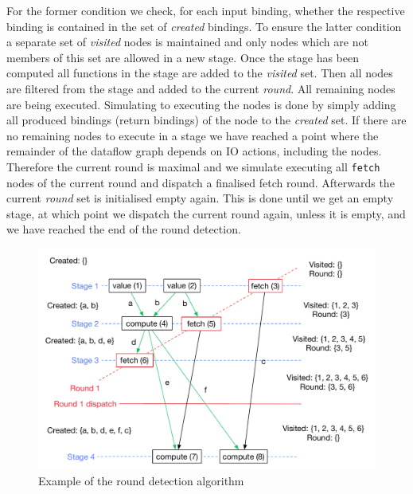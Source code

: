 For the former condition we check, for each input binding, whether the respective binding is contained in the set of \emph{created} bindings.
To ensure the latter condition a separate set of \emph{visited} nodes is maintained and only nodes which are not members of this set are allowed in a new stage.
Once the stage has been computed all functions in the stage are added to the \emph{visited} set.
Then all \fetch{} nodes are filtered from the stage and added to the current \emph{round}.
All remaining nodes are being executed.
Simulating to executing the nodes is done by simply adding all produced bindings (return bindings) of the node to the \emph{created} set.
If there are no remaining nodes to execute in a stage we have reached a point where the remainder of the dataflow graph depends on IO actions, including the \fetch{} nodes.
Therefore the current round is maximal and we simulate executing all \texttt{fetch} nodes of the current round and dispatch a finalised fetch round.
Afterwards the current \emph{round} set is initialised empty again.
This is done until we get an empty stage, at which point we dispatch the current round again, unless it is empty, and we have reached the end of the round detection.

\begin{figure}
    \includegraphics[width=\linewidth]{../Figures/yauhau-round-detection}
    \caption{Example of the round detection algorithm}
    \label{fig:yauhau-round-detection}
\end{figure}

